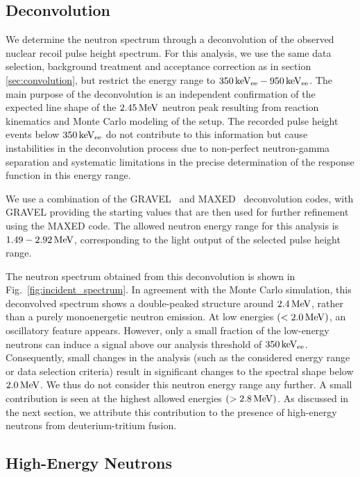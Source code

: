 \subsection{Deconvolution}\label{sec:deconvolution}
We determine the neutron spectrum through a deconvolution of  the observed nuclear recoil pulse height spectrum. For this analysis, we use the same data selection, background treatment and acceptance correction as in section \ref{sec:convolution}, but restrict the energy range to $350\,\mathrm{keV_{ee}}-950\,\mathrm{keV_{ee}}$.
The main purpose of the deconvolution is an independent confirmation of the expected line shape of the $2.45\,\mathrm{MeV}$ neutron peak resulting from reaction kinematics and Monte Carlo modeling of the setup. The recorded pulse height events below $350\,\mathrm{keV_{ee}}$ do not contribute to this information but cause instabilities in the deconvolution process due to non-perfect neutron-gamma separation and systematic limitations in the precise determination of the response function in this energy range.

We use a combination of the GRAVEL~\cite{Matzke:1994} and MAXED~\cite{Reginatto:2002} deconvolution codes, with GRAVEL providing the starting values that are then used for further refinement using the MAXED code. The allowed neutron energy range for this analysis is $1.49 - 2.92\,\mathrm{MeV}$, corresponding to the light output of the selected pulse height range.

The neutron spectrum obtained from this deconvolution is shown in Fig.~\ref{fig:incident_spectrum}. In agreement with the Monte Carlo simulation, this deconvolved spectrum shows a double-peaked structure around $2.4\,\mathrm{MeV}$, rather than a purely monoenergetic neutron emission. At low energies $(<2.0\,\mathrm{MeV})$, an oscillatory feature appears. However, only a small fraction of the low-energy neutrons can induce a signal above our analysis threshold of $350\,\mathrm{keV_{ee}}$. Consequently, small changes in the analysis (such as the considered energy range or data selection criteria) result in significant changes to the spectral shape below $2.0\,\mathrm{MeV}$. We thus do not consider this neutron energy range any further. A small contribution is seen at the highest allowed energies $(>2.8\,\mathrm{MeV})$. As discussed in the next section, we attribute this contribution to the presence of high-energy neutrons from deuterium-tritium fusion.

\subsection{High-Energy Neutrons} \label{sec:he_neutrons}

